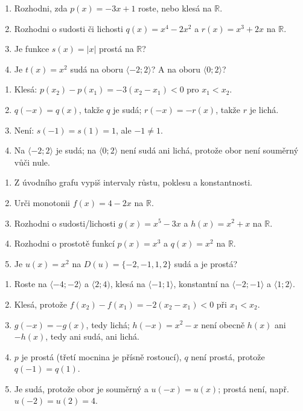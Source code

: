 \documentclass[11pt,a4paper]{article}
\begin{document}
\begin{zadaniReseniBox}[title={Samostatná práce 1}]
\begin{enumerate}[label=\alph*)]
\item Rozhodni, zda $p(x)=-3x+1$ roste, nebo klesá na $\mathbb R$.
\item Rozhodni o sudosti či lichosti $q(x)=x^4-2x^2$
    a $r(x)=x^3+2x$ na $\mathbb R$.
\item Je funkce $s(x)=|x|$ prostá na $\mathbb R$?
\item Je $t(x)=x^2$ sudá na oboru $\langle-2;2\rangle$?
    A na oboru $\langle0;2\rangle$?
\end{enumerate}
\tcblower
\begin{enumerate}[label=\alph*)]
\item Klesá: $p(x_2)-p(x_1)=-3(x_2-x_1)<0$ pro $x_1<x_2$.
\item $q(-x)=q(x)$, takže $q$ je sudá;
    $r(-x)=-r(x)$, takže $r$ je lichá.
\item Není: $s(-1)=s(1)=1$, ale $-1\ne1$.
\item Na $\langle-2;2\rangle$ je sudá; na $\langle0;2\rangle$
    není sudá ani lichá, protože obor není souměrný vůči nule.
\end{enumerate}
\end{zadaniReseniBox}

\begin{zadaniReseniBox}[title={Domácí úkol}]
\begin{enumerate}[label=\alph*)]
\item Z úvodního grafu vypiš intervaly růstu, poklesu
    a konstantnosti.
\item Urči monotonii $f(x)=4-2x$ na $\mathbb R$.
\item Rozhodni o sudosti/lichosti $g(x)=x^5-3x$
    a $h(x)=x^2+x$ na $\mathbb R$.
\item Rozhodni o prostotě funkcí $p(x)=x^3$ a $q(x)=x^2$
    na $\mathbb R$.
\item Je $u(x)=x^2$ na $D(u)=\{-2,-1,1,2\}$ sudá
    a je prostá?
\end{enumerate}
\tcblower
\begin{enumerate}[label=\alph*)]
\item Roste na $\langle-4;-2\rangle$ a $\langle2;4)$,
    klesá na $\langle-1;1\rangle$,
    konstantní na $\langle-2;-1\rangle$ a $\langle1;2\rangle$.
\item Klesá, protože $f(x_2)-f(x_1)=-2(x_2-x_1)<0$ při $x_1<x_2$.
\item $g(-x)=-g(x)$, tedy lichá; $h(-x)=x^2-x$ není
    obecně $h(x)$ ani $-h(x)$, tedy ani sudá, ani lichá.
\item $p$ je prostá (třetí mocnina je přísně rostoucí),
    $q$ není prostá, protože $q(-1)=q(1)$.
\item Je sudá, protože obor je souměrný a $u(-x)=u(x)$;
    prostá není, např. $u(-2)=u(2)=4$.
\end{enumerate}
\end{zadaniReseniBox}
\end{document}

